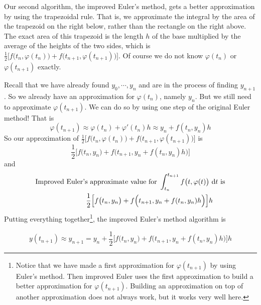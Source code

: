 Our second algorithm, the improved Euler's method, gets a better approximation 
by using the trapezoidal rule. That is, we approximate the integral
by the area of the trapezoid on the right below, rather than the rectangle
on the right above.
The exact area of this trapezoid is the length $h$ of the base multiplied
by the average of the heights of the two sides, which is $\frac{1}{2}\big[f\big(t_n,\varphi(t_n)\big)+f\big(t_{n+1},\varphi(t_{n+1})\big)\big]$. Of course we do not know $\varphi(t_n)$ or $\varphi(t_{n+1})$ exactly.

Recall that we have already found $y_0,\cdots,y_n$ and are in the process of finding $y_{n+1}$. So we already have an  approximation for $\varphi(t_n)$, namely $y_n$. But we still need to approximate $\varphi(t_{n+1})$. 
We can do so by using one step of the original Euler method! That is
\begin{equation*}
\varphi(t_{n+1})\approx \varphi(t_n)+\varphi'(t_n)h
\approx y_n+f(t_n,y_n)h
\end{equation*}
So our approximation  of
$\frac{1}{2}\big[f\big(t_n,\varphi(t_n)\big)+f\big(t_{n+1},\varphi(t_{n+1})\big)\big]$ is 
\begin{equation*}
\frac{1}{2}\Big[f\big(t_n,y_n\big)+f\Big(t_{n+1},y_n+f(t_n,y_n)h\Big)\Big]
\end{equation*}
and
\begin{align*}
&\text{Improved\ Euler's approximate value for }
\int_{t_n}^{t_{n+1}}f\big(t,\varphi(t)\big)\ \mathrm{d}t \text{ is}\\
&\hskip1in
\frac{1}{2}\Big[f\big(t_n,y_n\big)+f\Big(t_{n+1},y_n+f(t_n,y_n)h\Big)\Big]h
\end{align*}
Putting everything together\footnote{Notice that we have made a first approximation for $\varphi(t_{n+1})$ by using Euler's method. Then improved Euler uses the first approximation to build a better approximation for 
$\varphi(t_{n+1})$. Building an approximation on top of another approximation
does not always work, but it works very well here.}, the improved Euler's method algorithm is
\begin{impeqn}\label{ImpEul}
\begin{equation*}
y(t_{n+1})\approx y_{n+1}=y_n+
\frac{1}{2}\Big[f\big(t_n,y_n\big)+f\Big(t_{n+1},y_n+f(t_n,y_n)h\Big)\Big]h
\end{equation*}
\end{impeqn}

